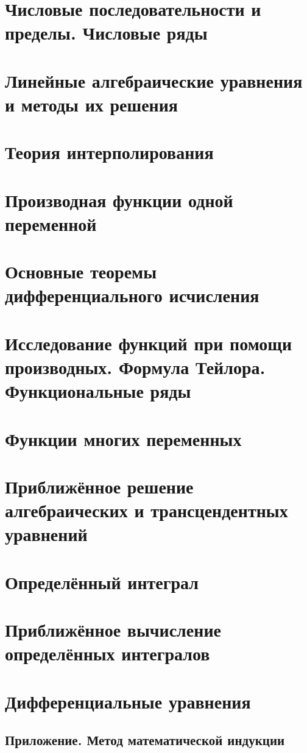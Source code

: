 \chapter[Числовые ряды]{Числовые последовательности и пределы. Числовые ряды}
\chapter[Линейные уравнения]{Линейные алгебраические уравнения и методы их решения}
\chapter{Теория интерполирования}
\chapter{Производная функции одной переменной}
\chapter[Дифференциальное исчисление]{Основные теоремы дифференциального исчисления}
\chapter[Исследование функции]{Исследование функций при помощи производных. Формула Тейлора.
Функциональные ряды}
\chapter{Функции многих переменных}
\chapter[Приближённое рещение уравнений]{Приближённое решение алгебраических и трансцендентных уравнений}
\chapter{Определённый интеграл}
\chapter[Вычисление интегралов]{Приближённое вычисление определённых интегралов}
\chapter{Дифференциальные уравнения}
\section{Приложение. Метод математической индукции}

